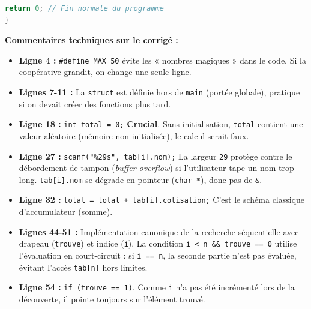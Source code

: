 \documentclass[11pt]{article}
\begin{document}
\begin{exoresolu}
\begin{lstlisting}[language=C, caption={Code source complet : cooperative-mballa2.c}]
    return 0; // Fin normale du programme
}
\end{lstlisting}

\textbf{Commentaires techniques sur le corrigé :}
\begin{itemize}
    \item \textbf{Ligne 4 :} \texttt{\#define MAX 50} évite les « nombres magiques » dans le code. Si la coopérative grandit, on change une seule ligne.
    \item \textbf{Lignes 7-11 :} La \texttt{struct} est définie hors de \texttt{main} (portée globale), pratique si on devait créer des fonctions plus tard.
    \item \textbf{Ligne 18 :} \texttt{int total = 0;} \textbf{Crucial}. Sans initialisation, \texttt{total} contient une valeur aléatoire (mémoire non initialisée), le calcul serait faux.
    \item \textbf{Ligne 27 :} \texttt{scanf("\%29s", tab[i].nom);} La largeur \texttt{29} protège contre le débordement de tampon (\emph{buffer overflow}) si l'utilisateur tape un nom trop long. \texttt{tab[i].nom} se dégrade en pointeur (\texttt{char *}), donc pas de \texttt{\&}.
    \item \textbf{Ligne 32 :} \texttt{total = total + tab[i].cotisation;} C'est le schéma classique d'accumulateur (somme).
    \item \textbf{Lignes 44-51 :} Implémentation canonique de la recherche séquentielle avec drapeau (\texttt{trouve}) et indice (\texttt{i}). La condition \texttt{i < n \&\& trouve == 0} utilise l'évaluation en court-circuit : si \texttt{i == n}, la seconde partie n'est pas évaluée, évitant l'accès \texttt{tab[n]} hors limites.
    \item \textbf{Ligne 54 :} \texttt{if (trouve == 1)}. Comme \texttt{i} n'a pas été incrémenté lors de la découverte, il pointe toujours sur l'élément trouvé.
\end{itemize}
\end{exoresolu}
\end{document}
